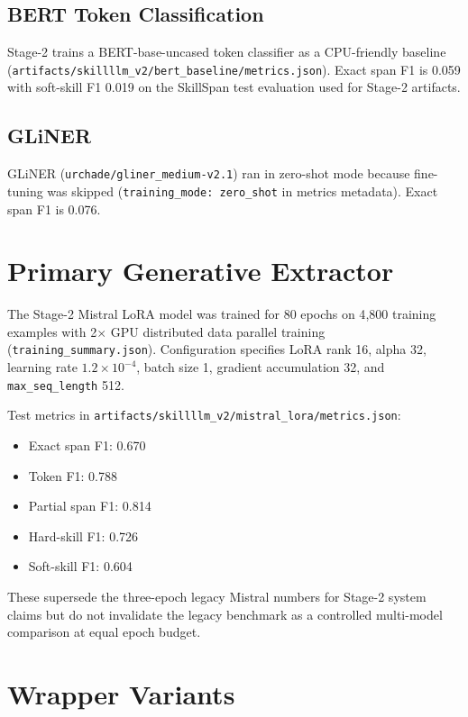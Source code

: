 \subsection{BERT Token Classification}

Stage-2 trains a BERT-base-uncased token classifier as a CPU-friendly baseline (\texttt{artifacts/skillllm\_v2/bert\_baseline/metrics.json}).
Exact span F1 is 0.059 with soft-skill F1 0.019 on the SkillSpan test evaluation used for Stage-2 artifacts.

\subsection{GLiNER}

GLiNER (\texttt{urchade/gliner\_medium-v2.1}) ran in zero-shot mode because fine-tuning was skipped (\texttt{training\_mode: zero\_shot} in metrics metadata).
Exact span F1 is 0.076.

\section{Primary Generative Extractor}

The Stage-2 Mistral LoRA model was trained for 80 epochs on 4{,}800 training examples with 2$\times$ GPU distributed data parallel training (\texttt{training\_summary.json}).
Configuration specifies LoRA rank 16, alpha 32, learning rate $1.2 \times 10^{-4}$, batch size 1, gradient accumulation 32, and \texttt{max\_seq\_length} 512.

Test metrics in \texttt{artifacts/skillllm\_v2/mistral\_lora/metrics.json}:

\begin{itemize}
  \item Exact span F1: 0.670
  \item Token F1: 0.788
  \item Partial span F1: 0.814
  \item Hard-skill F1: 0.726
  \item Soft-skill F1: 0.604
\end{itemize}

These supersede the three-epoch legacy Mistral numbers for Stage-2 system claims but do not invalidate the legacy benchmark as a controlled multi-model comparison at equal epoch budget.

\section{Wrapper Variants}

